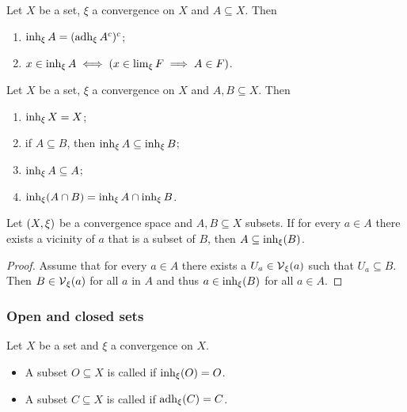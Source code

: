 \begin{lemma}
Let $X$ be a set, $\xi$ a convergence on $X$ and $A \subseteq X$. Then
\begin{enumerate}
\item $\operatorname{inh}_\xi A = (\operatorname{adh}_\xi A^c)^c$;
\item $x\in \operatorname{inh}_\xi A \iff (x\in \lim_\xi F \implies A\in F)$.
\end{enumerate}
\end{lemma}

\begin{proposition}
Let $X$ be a set, $\xi$ a convergence on $X$ and $A,B \subseteq X$. Then
\begin{enumerate}
\item $\operatorname{inh}_\xi X = X$;
\item if $A \subseteq B$, then $\operatorname{inh}_\xi A \subseteq \operatorname{inh}_\xi B$;
\item $\operatorname{inh}_\xi A\subseteq A$;
\item $\operatorname{inh}_\xi(A\cap B) = \operatorname{inh}_\xi A \cap \operatorname{inh}_\xi B$.
\end{enumerate}
\end{proposition}

\begin{lemma} \label{subsetWithVicinitiesInInherence}
Let $\left( X,\xi \right)$ be a convergence space and $A,B\subseteq X$ subsets. If for every $a\in A$ there exists a vicinity of $a$ that is a subset of $B$, then $A\subseteq \operatorname{inh}_\xi(B)$.
\end{lemma}
\begin{proof}
Assume that for every $a\in A$ there exists a $U_a \in \operatorname{\mathcal{V}}_\xi(a)$ such that $U_a \subseteq B$. Then $B\in \operatorname{\mathcal{V}}_\xi(a)$ for all $a$ in $A$ and thus $a\in \operatorname{inh}_\xi(B)$ for all $a\in A$.
\end{proof}

\subsubsection{Open and closed sets}
\begin{definition}
Let $X$ be a set and $\xi$ a convergence on $X$.
\begin{itemize}
    \item A subset $O \subseteq X$ is called  if $\operatorname{inh}_\xi(O) = O$.
    \item A subset $C \subseteq X$ is called  if $\operatorname{adh}_\xi(C) = C$.
\end{itemize}
\end{definition}

